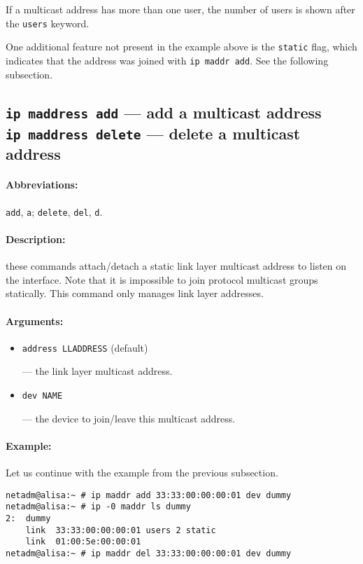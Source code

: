 If a multicast address has more than one user, the number
of users is shown after the \verb|users| keyword.

One additional feature not present in the example above
is the \verb|static| flag, which indicates that the address was joined
with \verb|ip maddr add|. See the following subsection.



\subsection{{\tt ip maddress add} --- add a multicast address\\
	    {\tt ip maddress delete} --- delete a multicast address}

\paragraph{Abbreviations:} \verb|add|, \verb|a|; \verb|delete|, \verb|del|, \verb|d|.

\paragraph{Description:} these commands attach/detach
a static link layer multicast address to listen on the interface.
Note that it is impossible to join protocol multicast groups
statically. This command only manages link layer addresses.


\paragraph{Arguments:}

\begin{itemize}
\item \verb|address LLADDRESS| (default)

--- the link layer multicast address.

\item \verb|dev NAME|

--- the device to join/leave this multicast address.

\end{itemize}


\paragraph{Example:} Let us continue with the example from the previous subsection.

\begin{verbatim}
netadm@alisa:~ # ip maddr add 33:33:00:00:00:01 dev dummy
netadm@alisa:~ # ip -0 maddr ls dummy
2:  dummy
    link  33:33:00:00:00:01 users 2 static
    link  01:00:5e:00:00:01
netadm@alisa:~ # ip maddr del 33:33:00:00:00:01 dev dummy
\end{verbatim}

